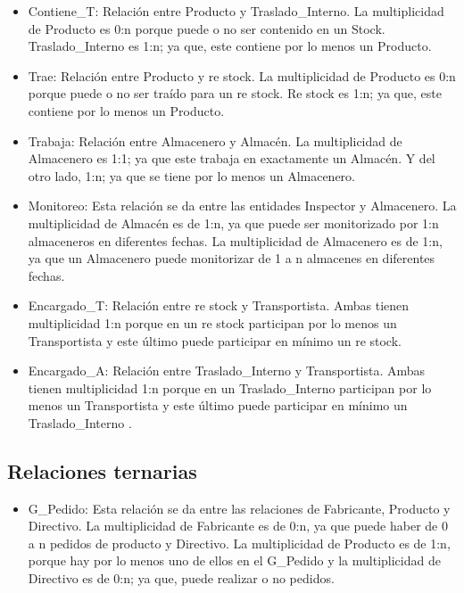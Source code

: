 \documentclass[10pt, a4paper,openany]{report}
\begin{document}
\begin{itemize}
\item Contiene\_T: Relación entre Producto y Traslado\_Interno. La multiplicidad de Producto es 0:n porque puede o no ser contenido en un Stock. Traslado\_Interno es 1:n; ya que, este contiene por lo menos un Producto.
\item Trae: Relación entre Producto y re stock. La multiplicidad de Producto es 0:n porque puede o no ser traído para un re stock. Re stock es 1:n; ya que, este contiene por lo menos un Producto.

\item Trabaja: Relación entre Almacenero y Almacén. La multiplicidad de Almacenero es 1:1; ya que este trabaja en exactamente un Almacén. Y del otro lado, 1:n; ya que se tiene por lo menos un Almacenero.
\item Monitoreo: Esta relación se da entre las entidades Inspector y Almacenero. La multiplicidad de Almacén es de 1:n, ya que puede ser monitorizado  por 1:n almaceneros en diferentes fechas. La multiplicidad de  Almacenero es de 1:n, ya que un Almacenero puede monitorizar de 1 a n almacenes en diferentes fechas.
\item Encargado\_T: Relación entre re stock y Transportista. Ambas tienen multiplicidad 1:n porque en un re stock participan por lo menos un Transportista y este último puede participar en mínimo un re stock.
\item Encargado\_A: Relación entre Traslado\_Interno y Transportista. Ambas tienen multiplicidad 1:n porque en un Traslado\_Interno participan por lo menos un Transportista y este último puede participar en mínimo un Traslado\_Interno .

\end{itemize}


\subsection{Relaciones ternarias} %
\label{sub:Relaciones ternarias}

\begin{itemize}
  \item G\_Pedido: Esta relación se da entre las relaciones de Fabricante, Producto y Directivo. La multiplicidad de Fabricante es de 0:n, ya que puede haber de 0 a n pedidos de producto y Directivo. La multiplicidad de Producto es de 1:n, porque hay por lo menos uno de ellos en el G\_Pedido y la multiplicidad de Directivo es de 0:n; ya que, puede realizar o no pedidos.
\end{itemize}
\end{document}
